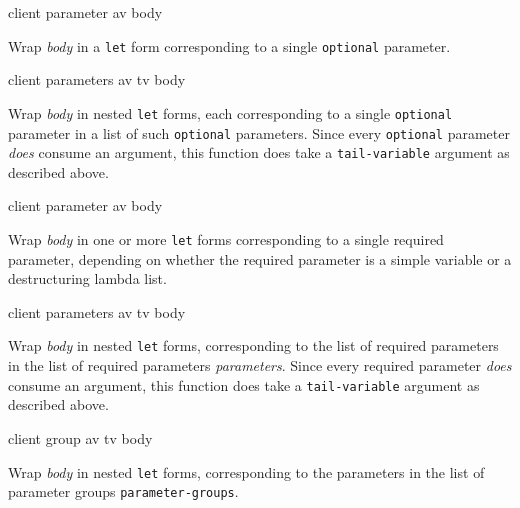  {client parameter av body}

Wrap \textit{body} in a \texttt{let} form corresponding to a single
\texttt{optional} parameter.

 {client parameters av tv body}

Wrap \textit{body} in nested \texttt{let} forms, each corresponding to
a single \texttt{optional} parameter in a list of such
\texttt{optional} parameters.  Since every \texttt{optional} parameter
\textit{does} consume an argument, this function does take a
\texttt{tail-variable} argument as described above.

 {client parameter av body}

Wrap \textit{body} in one or more \texttt{let} forms corresponding to
a single required parameter, depending on whether the required
parameter is a simple variable or a destructuring lambda list.

 {client parameters av tv body}

Wrap \textit{body} in nested \texttt{let} forms, corresponding to the
list of required parameters in the list of required parameters
\textit{parameters}.  Since every required parameter \textit{does}
consume an argument, this function does take a \texttt{tail-variable}
argument as described above.

 {client group av tv body}

Wrap \textit{body} in nested \texttt{let} forms, corresponding to the
parameters in the list of parameter groups \texttt{parameter-groups}.
